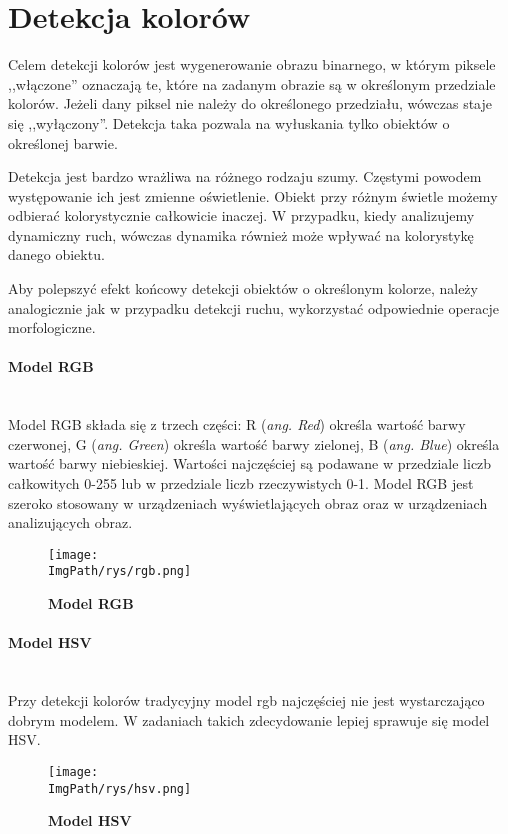 \documentclass[a4paper,12pt,twoside,openany]{report}
\newcommand{\ImgPath}{.}
\begin{document}
\section{Detekcja kolorów}
Celem detekcji kolorów jest wygenerowanie obrazu binarnego, w którym piksele ,,włączone'' oznaczają te, które na zadanym obrazie są w określonym przedziale kolorów. Jeżeli dany piksel nie należy do określonego  przedziału, wówczas staje się ,,wyłączony''. Detekcja taka pozwala na wyłuskania tylko obiektów o określonej barwie.

Detekcja jest bardzo wrażliwa na różnego rodzaju szumy. Częstymi powodem występowanie ich jest zmienne oświetlenie. Obiekt przy różnym świetle możemy odbierać kolorystycznie całkowicie inaczej. W przypadku, kiedy analizujemy dynamiczny ruch, wówczas dynamika również może wpływać na kolorystykę danego obiektu.  

Aby polepszyć efekt końcowy detekcji obiektów o określonym kolorze, należy analogicznie jak w przypadku detekcji ruchu, wykorzystać odpowiednie operacje morfologiczne. 

\paragraph{Model RGB} \mbox{} \\
\indent
Model RGB składa się z trzech części: R (\textit{ang. Red}) określa wartość barwy czerwonej, G (\textit{ang. Green}) określa wartość barwy zielonej, B (\textit{ang. Blue}) określa wartość barwy niebieskiej. Wartości najczęściej są podawane w przedziale liczb całkowitych 0-255 lub w przedziale liczb rzeczywistych 0-1. Model RGB jest szeroko stosowany w urządzeniach wyświetlających obraz oraz w urządzeniach analizujących obraz.
\begin{figure}[H]	
	\centering
	\texttt{[image: \\ImgPath/rys/rgb.png]}
	
	\caption{  \textbf{Model RGB}}
\end{figure}

\paragraph{Model HSV} \mbox{} \\ 
\indent
Przy detekcji kolorów tradycyjny model rgb najczęściej nie jest wystarczająco dobrym modelem. W zadaniach takich zdecydowanie lepiej sprawuje się model HSV.

\begin{figure}[H]	
	\centering
	\texttt{[image: \\ImgPath/rys/hsv.png]}
	
	\caption{  \textbf{Model HSV}}
\end{figure}
\end{document}
